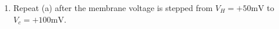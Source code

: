 \documentclass[11pt]{article}
\begin{document}
\begin{enumerate}[label=\arabic*.]
\begin{enumerate}[label=(\alph*)]
\item
Repeat (a) after the membrane voltage is stepped from $V_H = +50 \text{mV}$ to $V_c = +100 \text{mV}$.












\end{enumerate}




\end{enumerate}
\end{document}
